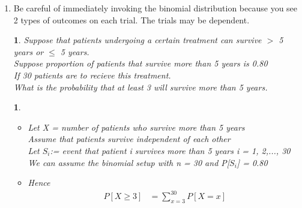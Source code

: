 \documentclass[11pt]{article}
\newtheorem*{solution}{\framebox{Sol}}
\newtheorem{example}{\framebox{Ex}}[section]
\newcommand\tab[1][1cm]{\hspace*{#1}}
\begin{document}
\begin{enumerate}
\begin{proof}
\begin{itemize}
                                    \begin{enumerate}
                                        \item you have trials that result in one of two possible outcomes with equal probability
                                        \item you can assume that these trials are independent, then X = number of successes in these n-trials has a binomial distribution
                                    \end{enumerate}
                        \end{itemize}
                    \end{proof}

            \item Be careful of immediately invoking the binomial distribution because you see 2 types of outcomes on each trial. The trials may be dependent. 
                    \begin{example}
                        Suppose that patients undergoing a certain treatment can survive $>$ 5 years or $\leq$ 5 years. \\
                        Suppose proportion of patients that survive more than 5 years is 0.80 \\
                        If 30 patients are to recieve this treatment. \\
                        What is the probability that at least 3 will survive more than 5 years. 
                    \end{example}
                    \begin{solution} \tab 
                        \begin{itemize}
                            \item Let X = number of patients who survive more than 5 years\\
                                    Assume that patients survive independent of each other \\
                                    Let $S_i$:= event that patient i survives more than 5 years i = 1, 2,..., 30 \\
                                    We can assume the binomial setup with n = 30 and P[$S_i$] = 0.80
                            \item Hence 
                                    \begin{align*}
                                        P[X \geq 3] &= \sum_{x = 3}^{30} P[X = x] \\

\end{align*}
\end{itemize}
\end{solution}
\end{enumerate}
\end{document}
